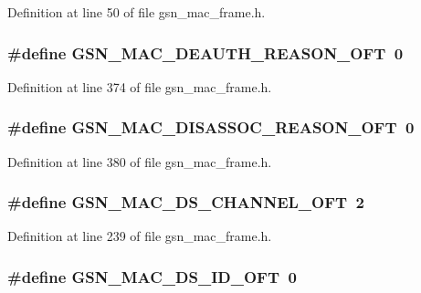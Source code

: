 Definition at line 50 of file gsn\_\-mac\_\-frame.h.

\hypertarget{a00523_a75a4e020aa2a89ba6a5cabdaaa1d18bd}{
\subsubsection[{GSN\_\-MAC\_\-DEAUTH\_\-REASON\_\-OFT}]{\setlength{\rightskip}{0pt plus 5cm}\#define GSN\_\-MAC\_\-DEAUTH\_\-REASON\_\-OFT~0}}
\label{a00523_a75a4e020aa2a89ba6a5cabdaaa1d18bd}


Definition at line 374 of file gsn\_\-mac\_\-frame.h.

\hypertarget{a00523_a1f36f6cb86cbf423b8186ad41f79c916}{
\subsubsection[{GSN\_\-MAC\_\-DISASSOC\_\-REASON\_\-OFT}]{\setlength{\rightskip}{0pt plus 5cm}\#define GSN\_\-MAC\_\-DISASSOC\_\-REASON\_\-OFT~0}}
\label{a00523_a1f36f6cb86cbf423b8186ad41f79c916}


Definition at line 380 of file gsn\_\-mac\_\-frame.h.

\hypertarget{a00523_a3fe4bf3d3d99ce2767c3f022f1059b89}{
\subsubsection[{GSN\_\-MAC\_\-DS\_\-CHANNEL\_\-OFT}]{\setlength{\rightskip}{0pt plus 5cm}\#define GSN\_\-MAC\_\-DS\_\-CHANNEL\_\-OFT~2}}
\label{a00523_a3fe4bf3d3d99ce2767c3f022f1059b89}


Definition at line 239 of file gsn\_\-mac\_\-frame.h.

\hypertarget{a00523_af2fff36089d2976d984123b9ca80f73c}{
\subsubsection[{GSN\_\-MAC\_\-DS\_\-ID\_\-OFT}]{\setlength{\rightskip}{0pt plus 5cm}\#define GSN\_\-MAC\_\-DS\_\-ID\_\-OFT~0}}
\label{a00523_af2fff36089d2976d984123b9ca80f73c}


